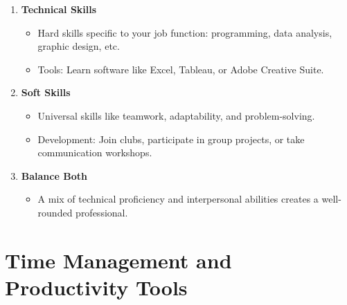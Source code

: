 \documentclass[
  letterpaper,
  DIV=11,
  numbers=noendperiod]{scrreprt}
\providecommand{\tightlist}{%
  \setlength{\itemsep}{0pt}\setlength{\parskip}{0pt}}\usepackage{longtable,booktabs,array}
\begin{document}
\begin{enumerate}
\def\labelenumi{\arabic{enumi}.}
\item
  \textbf{Technical Skills}

  \begin{itemize}
  \tightlist
  \item
    Hard skills specific to your job function: programming, data
    analysis, graphic design, etc.
  \item
    Tools: Learn software like Excel, Tableau, or Adobe Creative Suite.
  \end{itemize}
\item
  \textbf{Soft Skills}

  \begin{itemize}
  \tightlist
  \item
    Universal skills like teamwork, adaptability, and problem-solving.
  \item
    Development: Join clubs, participate in group projects, or take
    communication workshops.
  \end{itemize}
\item
  \textbf{Balance Both}

  \begin{itemize}
  \tightlist
  \item
    A mix of technical proficiency and interpersonal abilities creates a
    well-rounded professional.
  \end{itemize}
\end{enumerate}

\section{Time Management and Productivity
Tools}\label{time-management-and-productivity-tools}
\end{document}
